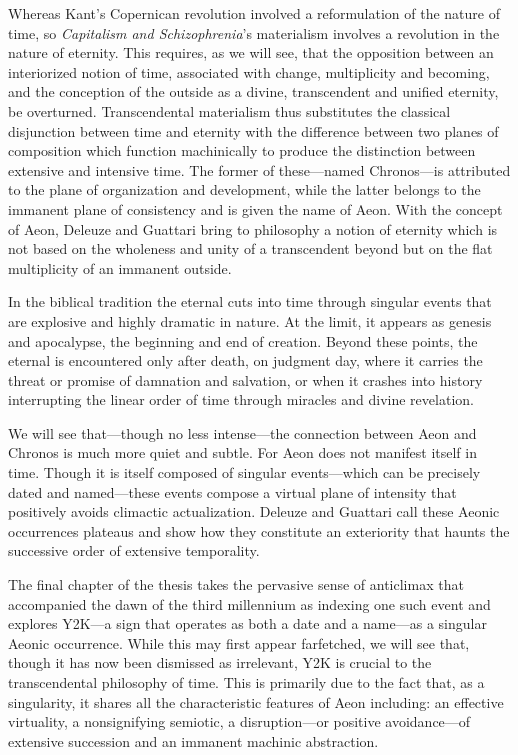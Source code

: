 Whereas Kant's Copernican revolution involved a reformulation of the nature of time, so \textit{Capitalism and Schizophrenia}'s materialism involves a revolution in the nature of eternity. This requires, as we will see, that the opposition between an interiorized notion of time, associated with change, multiplicity and becoming, and the conception of the outside as a divine, transcendent and unified eternity, be overturned. Transcendental materialism thus substitutes the classical disjunction between time and eternity with the difference between two planes of composition which function machinically to produce the distinction between extensive and intensive time. The former of these---named Chronos---is attributed to the plane of organization and development, while the latter belongs to the immanent plane of consistency and is given the name of Aeon. With the concept of Aeon, Deleuze and Guattari bring to philosophy a notion of eternity which is not based on the wholeness and unity of a transcendent beyond but on the flat multiplicity of an immanent outside.

In the biblical tradition the eternal cuts into time through singular events that are explosive and highly dramatic in nature. At the limit, it appears as genesis and apocalypse, the beginning and end of creation. Beyond these points, the eternal is encountered only after death, on judgment day, where it carries the threat or promise of damnation and salvation, or when it crashes into history interrupting the linear order of time through miracles and divine revelation. 

We will see that---though no less intense---the connection between Aeon and Chronos is much more quiet and subtle. For Aeon does not manifest itself in time. Though it is itself composed of singular events---which can be precisely dated and named---these events compose a virtual plane of intensity that positively avoids climactic actualization. Deleuze and Guattari call these Aeonic occurrences plateaus and show how they constitute an exteriority that haunts the successive order of extensive temporality.

The final chapter of the thesis takes the pervasive sense of anticlimax that accompanied the dawn of the third millennium as indexing one such event and explores Y2K---a sign that operates as both a date and a name---as a singular Aeonic occurrence. While this may first appear farfetched, we will see that, though it has now been dismissed as irrelevant, Y2K is crucial to the transcendental philosophy of time. This is primarily due to the fact that, as a singularity, it shares all the characteristic features of Aeon including: an effective virtuality, a nonsignifying semiotic, a disruption---or positive avoidance---of extensive succession and an immanent machinic abstraction.

